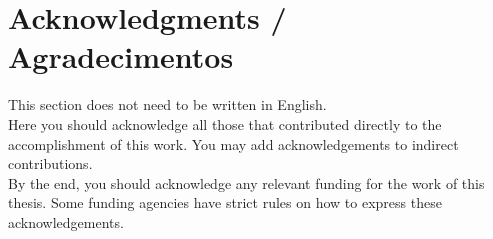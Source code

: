 \chapter*{Acknowledgments / Agradecimentos}

This section does not need to be written in English. \\

Here you should acknowledge all those that contributed directly to the accomplishment of  this work. You may  add acknowledgements to indirect contributions. \\

By the end, you should acknowledge any relevant funding for the work of this thesis. Some funding agencies have strict rules on how to express these acknowledgements.
